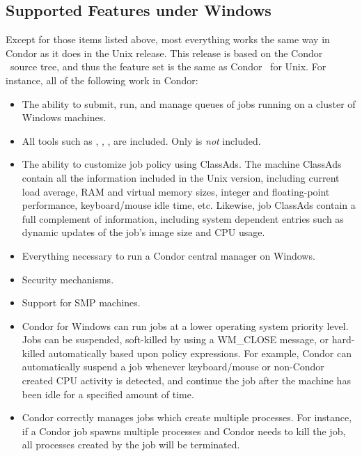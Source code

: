 \subsection{Supported Features under Windows}

Except for those items listed above, most everything works
the same way in Condor as it does in the Unix release.
This release is based on the Condor \VersionNotice\ source tree, and thus the
feature set is the same as Condor \VersionNotice\ for Unix.  
For instance, all of the following work in Condor:
\begin{itemize}

\item The ability to submit, run, and manage queues of jobs running on a
cluster of Windows machines.

\item All tools such as , , ,
are included. Only  is
\emph{not} included.

\item The ability to customize job policy using ClassAds.
The machine ClassAds contain all the information included in the Unix version,
including current load average, RAM and virtual memory sizes, integer and
floating-point performance, keyboard/mouse idle time, etc.  Likewise, job
ClassAds contain a full complement of information, including system
dependent entries such as dynamic updates of the job's image size and CPU
usage.

\item Everything necessary to run a Condor central manager on Windows.

\item Security mechanisms.

\item Support for SMP machines.

\item Condor for Windows can run jobs at a lower operating system
priority level.
Jobs can be suspended, soft-killed by using a WM\_CLOSE message,
or hard-killed automatically based upon policy expressions.
For example, Condor can automatically suspend a job
whenever keyboard/mouse or non-Condor created CPU activity is detected, and
continue the job after the machine has been idle for a specified amount
of time.

\item Condor correctly manages jobs which create multiple processes.  For
instance, if a Condor job spawns multiple processes and Condor
needs to kill the job,
all processes created by the job will be terminated.


\end{itemize}
